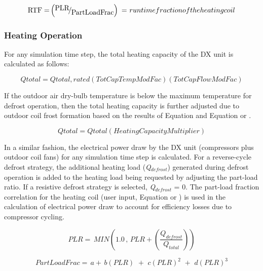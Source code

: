 \begin{equation}
{\rm{RTF  =  }}\left( {{\raise0.7ex\hbox{{{\rm{PLR}}}} \!\mathord{\left/ {\vphantom {{{\rm{PLR}}} {{\rm{PartLoadFrac}}}}}\right.}\!\lower0.7ex\hbox{{{\rm{PartLoadFrac}}}}}} \right)\,\,{\rm{ = }}\,\,runtime fraction of the heating coil
\end{equation}

\subsubsection{Heating Operation}\label{heating-operation-000}

For any simulation time step, the total heating capacity of the DX unit is calculated as follows:

\begin{equation}
Qtotal = Qtotal,rated\left( {TotCapTempModFac} \right)\left( {TotCapFlowModFac} \right)
\end{equation}

If the outdoor air dry-bulb temperature is below the maximum temperature for defrost operation, then the total heating capacity is further adjusted due to outdoor coil frost formation based on the results of Equation and Equation or .

\begin{equation}
Qtotal = Qtotal\left( {HeatingCapacityMultiplier} \right)
\end{equation}

In a similar fashion, the electrical power draw by the DX unit (compressors plus outdoor coil fans) for any simulation time step is calculated. For a reverse-cycle defrost strategy, the additional heating load (\emph{Q\(_{defrost}\)}) generated during defrost operation is added to the heating load being requested by adjusting the part-load ratio. If a resistive defrost strategy is selected, \emph{Q\(_{defrost}\)} = 0. The part-load fraction correlation for the heating coil (user input, Equation or ) is used in the calculation of electrical power draw to account for efficiency losses due to compressor cycling.

\begin{equation}
  PLR = \,MIN \left( 1.0\,,\,PLR + \left( \frac{Q_{defrost}}{Q_{total}} \right) \right)
\end{equation}

\begin{equation}
PartLoadFrac = \,a + \,b\left( {PLR} \right)\,\, + \,\,c{\left( {PLR} \right)^2}\,\, + \,\,d{\left( {PLR} \right)^3}
\end{equation}


